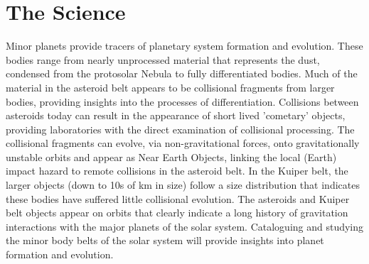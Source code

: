 \section{The Science}
Minor planets provide tracers of planetary system formation and evolution. 
These bodies range from nearly unprocessed material that represents the dust, condensed from the protosolar Nebula to fully differentiated bodies. Much of the material in the asteroid belt appears to be collisional fragments from larger bodies, providing insights into the processes of differentiation. Collisions between asteroids today can result in the appearance of short lived 'cometary' objects, providing laboratories with the direct examination of collisional processing. The collisional fragments can evolve, via non-gravitational forces, onto gravitationally unstable orbits and appear as Near Earth Objects, linking the local (Earth) impact hazard to remote collisions in the asteroid belt. In the Kuiper belt, the larger objects (down to 10s of km in size) follow a size distribution that indicates these bodies have suffered little collisional evolution.  The asteroids and Kuiper belt objects appear on orbits that clearly indicate a long history of gravitation interactions with the major planets of the solar system. Cataloguing and studying the minor body belts of the solar system will provide insights into planet formation and evolution.

